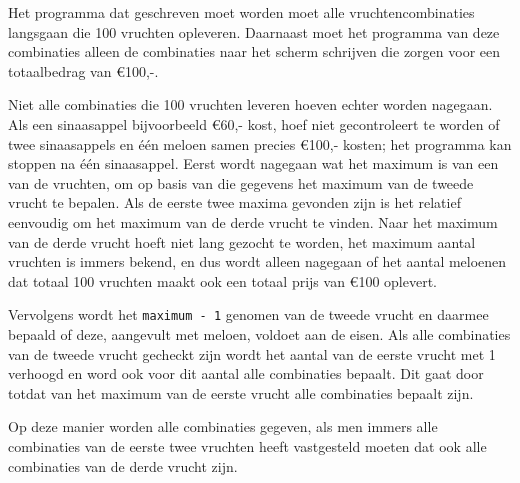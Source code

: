 Het programma dat geschreven moet worden moet alle vruchtencombinaties langsgaan die 100 vruchten opleveren. Daarnaast moet het programma van deze combinaties alleen de combinaties naar het scherm schrijven die zorgen voor een totaalbedrag van \euro 100,-.

Niet alle combinaties die 100 vruchten leveren hoeven echter worden nagegaan. Als een sinaasappel bijvoorbeeld \euro60,- kost, hoef niet gecontroleert te worden of twee sinaasappels en \'e\'en meloen samen precies \euro 100,- kosten; het programma kan stoppen na \'e\'en sinaasappel. 
Eerst wordt nagegaan wat het maximum is van een van de vruchten, om op basis van die gegevens het maximum van de tweede vrucht te bepalen.
Als de eerste twee maxima gevonden zijn is het relatief eenvoudig om het maximum van de derde vrucht te vinden.
Naar het maximum van de derde vrucht hoeft niet lang gezocht te worden, het maximum aantal vruchten is immers bekend, en dus wordt alleen nagegaan of het aantal meloenen dat totaal 100 vruchten maakt ook een totaal prijs van \euro 100 oplevert.

Vervolgens wordt het {\tt maximum - 1} genomen van de tweede vrucht en daarmee bepaald of deze, aangevult met meloen, voldoet aan de eisen.
Als alle combinaties van de tweede vrucht gecheckt zijn wordt het aantal van de eerste vrucht met 1 verhoogd en word ook voor dit aantal alle combinaties bepaalt.
Dit gaat door totdat van het maximum van de eerste vrucht alle combinaties bepaalt zijn.

Op deze manier worden alle combinaties gegeven, als men immers alle combinaties van de eerste twee vruchten heeft vastgesteld moeten dat ook alle combinaties van de derde vrucht zijn.